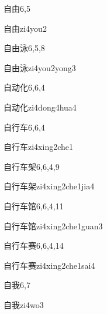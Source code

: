 \begin{entry}{自由}{6,5}
  \begin{phonetics}{自由}{zi4you2}
  \end{phonetics}
\end{entry}

\begin{entry}{自由泳}{6,5,8}
  \begin{phonetics}{自由泳}{zi4you2yong3}
  \end{phonetics}
\end{entry}

\begin{entry}{自动化}{6,6,4}
  \begin{phonetics}{自动化}{zi4dong4hua4}
  \end{phonetics}
\end{entry}

\begin{entry}{自行车}{6,6,4}
  \begin{phonetics}{自行车}{zi4xing2che1}
  \end{phonetics}
\end{entry}

\begin{entry}{自行车架}{6,6,4,9}
  \begin{phonetics}{自行车架}{zi4xing2che1jia4}
  \end{phonetics}
\end{entry}

\begin{entry}{自行车馆}{6,6,4,11}
  \begin{phonetics}{自行车馆}{zi4xing2che1guan3}
  \end{phonetics}
\end{entry}

\begin{entry}{自行车赛}{6,6,4,14}
  \begin{phonetics}{自行车赛}{zi4xing2che1sai4}
  \end{phonetics}
\end{entry}

\begin{entry}{自我}{6,7}
  \begin{phonetics}{自我}{zi4wo3}
  \end{phonetics}
\end{entry}

